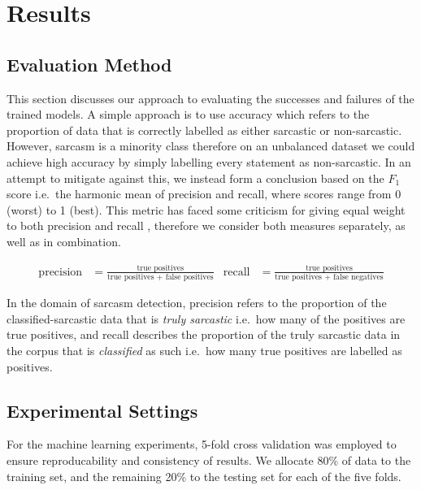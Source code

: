 \documentclass[12pt,a4paper]{article}
\begin{document}
\section{Results}
\subsection{Evaluation Method}
\noindent This section discusses our approach to evaluating the successes and failures of the trained models. A simple approach is to use accuracy which refers to the proportion of data that is correctly labelled as either sarcastic or non-sarcastic. However, sarcasm is a minority class therefore on an unbalanced dataset we could achieve high accuracy by simply labelling every statement as non-sarcastic. In an attempt to mitigate against this, we instead form a conclusion based on the $F_{1}$ score i.e.\ the harmonic mean of precision and recall, where scores range from 0 (worst) to 1 (best). This metric has faced some criticism for giving equal weight to both precision and recall \cite{hand2018note}, therefore we consider both measures separately, as well as in combination.

\begin{align*}
\mbox{precision} &= \frac{\mbox{true positives}}{\mbox{true positives + false positives}}   &  \mbox{recall} &= \frac{\mbox{true positives}}{\mbox{true positives + false negatives}}
\end{align*}

\noindent In the domain of sarcasm detection, precision refers to the proportion of the classified-sarcastic data that is \textit{truly sarcastic} i.e.\ how many of the positives are true positives, and recall describes the proportion of the truly sarcastic data in the corpus that is \textit{classified} as such i.e.\ how many true positives are labelled as positives. \\


\subsection{Experimental Settings}
For the machine learning experiments, 5-fold cross validation was employed to ensure reproducability and consistency of results. We allocate 80\% of data to the training set, and the remaining 20\% to the testing set for each of the five folds.\\
\end{document}
